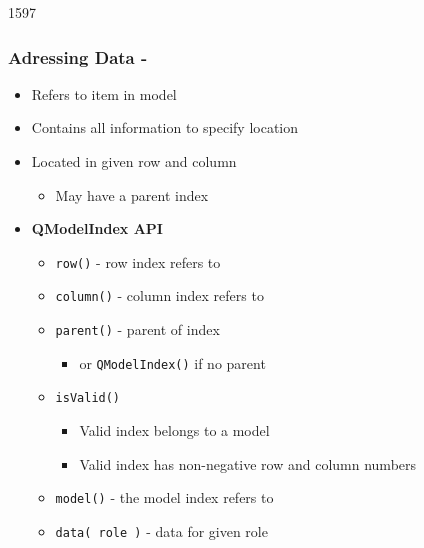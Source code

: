 \begin{slide}{1597}\frametitle{Adressing Data - }
  \begin{itemize}
  \item Refers to item in model
  \item Contains all information to specify location
  \item Located in given row and column
    \begin{itemize}
    \item May have a parent index
    \end{itemize}
    \medskip
  \item \textbf{QModelIndex API}
    \begin{itemize}
    \item \texttt{row()} - row index refers to
    \item \texttt{column()} - column index refers to
    \item \texttt{parent()} - parent of index
      \begin{itemize}
      \item or \texttt{QModelIndex()} if no parent
      \end{itemize}
    \item \texttt{isValid()}
      \begin{itemize}
      \item Valid index belongs to a model
      \item Valid index has non-negative row and column numbers
      \end{itemize}
    \item \texttt{model()} - the model index refers to
    \item \texttt{data( role )} - data for given role
    \end{itemize}
  \end{itemize}
\end{slide}

